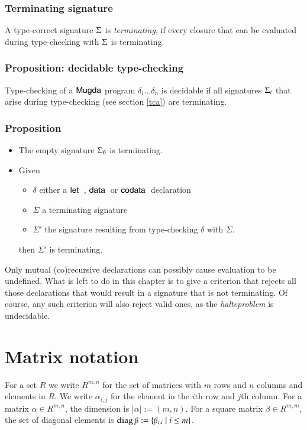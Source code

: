\subsubsection{Terminating signature}
A type-correct signature $\Sigma$ is \emph{terminating}, if every closure that can be evaluated during type-checking with $\Sigma$ is terminating. 

\subsubsection{Proposition: decidable type-checking}
Type-checking of a $\textsf{Mugda}$ program $\delta_i \ldots \delta_n$ is decidable if all signatures $\Sigma_i$ that arise during type-checking (see section {\ref{tca}}) are terminating. 

\subsubsection{Proposition}
\begin{itemize}
\item
The empty signature $\Sigma_0$ is terminating.
\item
Given
\begin{itemize}
\item
$\delta$ either a $\mathsf{let}\:$ , $\mathsf{data}\: $ or $\mathsf{codata}\:$ declaration
\item
$\Sigma$ a terminating signature 
\item
$\Sigma'$ the signature resulting from type-checking $\delta$ with $\Sigma$. 
\end{itemize}
then $\Sigma'$ is terminating. 
\end{itemize}
\noindent Only mutual (co)recursive declarations can possibly cause evaluation to be undefined.
What is left to do in this chapter is to give a criterion that rejects all those declarations that would result in a signature that is not terminating. Of course, any such criterion will also reject valid ones, as the \emph{halteproblem} is undecidable.

\section{Matrix notation}

\newcommand{\diag}{\opn{diag}}

For a set $R$ we write $R^{m,n}$ for the set of matrices with $m$ rows and $n$ columns and elements in $R$.
We write $\alpha_{i,j}$ for the element in the $i$th row and $j$th column.
For a matrix $\alpha \in R^{m,n}$, the dimension is $\vert\alpha\vert := (m,n)$.
For a square matrix $\beta \in R^{m,m}$, the set of diagonal elements is $\diag \beta := \{ \beta_{i,i} \mid i \leq m\}$.

